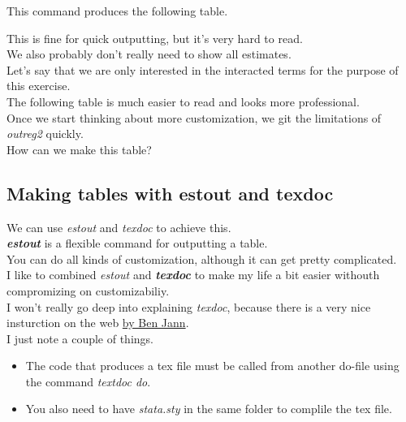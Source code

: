\documentclass[14pt]{article}
\begin{document}
This command produces the following table. \\

\begin{table}[H]
	\centering
\end{table}


This is fine for quick outputting, but it's very hard to read. \\

We also probably don't really need to show all estimates. \\

Let's say that we are only interested in the interacted terms for the purpose of this exercise. \\

The following table is much easier to read and looks more professional. \\

 


Once we start thinking about more customization, we git the limitations of \textit{outreg2} quickly. \\

How can we make this table? \\
\newpage
\subsection{Making tables with estout and texdoc}

We can use \textit{estout} and \textit{texdoc} to achieve this. \\


\textbf{\textit{estout}} is a flexible command for outputting a table. \\

You can do all kinds of customization, although it can get pretty complicated. \\

I like to combined \textit{estout} and \textbf{\textit{texdoc}} to make my life a bit easier withouth compromizing on customizabiliy. \\


I won't really go deep into explaining \textit{texdoc}, because there is a very nice insturction on the web \href{http://repec.sowi.unibe.ch/stata/texdoc/getting-started.html}{by Ben Jann}. \\

I just note a couple of things.
\begin{itemize}
	\item The code that produces a tex file must be called from another do-file using the command \textit{textdoc do}.
	\item You also need to have \textit{stata.sty} in the same folder to complile the tex file.
\end{itemize}
\end{document}
